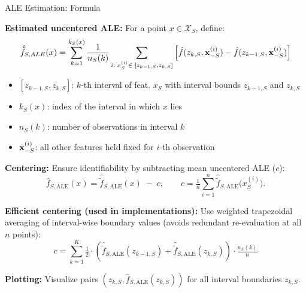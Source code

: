 \documentclass[10pt,compress,t,notes=noshow, xcolor=table]{beamer}
\begin{document}
\begin{frame}{ALE Estimation: Formula}

\textbf{Estimated uncentered ALE:}  
For a point $x \in \mathcal{X}_S$, define:
\[
\hat{\tilde{f}}_{S, ALE}(x) = \sum_{k = 1}^{k_S(x)}\frac{1}{n_S(k)}\sum_{i: \; x_S^{(i)} \in \; [z_{k-1, S}, z_{k, S}]}\left[\hat{f}(z_{k, S}, \mathbf{x}^{(i)}_{-S}) -\hat{f}(z_{k-1, S}, \mathbf{x}^{(i)}_{-S})\right]
\]

\begin{itemize}
  \item $[z_{k-1, S}, z_{k,S}]$: $k$-th interval of feat. $x_S$ with interval bounds $z_{k-1, S}$ and $z_{k,S}$ 
  \item $k_S(x)$: index of the interval in which $x$ lies
  \item $n_S(k)$: number of observations in interval $k$
  \item $\mathbf{x}_{-S}^{(i)}$: all other features held fixed for $i$-th observation
\end{itemize}

\pause
\medskip
\textbf{Centering:}  
Ensure identifiability by subtracting mean uncentered ALE ($c$):
\[
\hat f_{S,\text{ALE}}(x)=
\hat{\tilde f}_{S,\text{ALE}}(x)\;-\;c,
\qquad
c=\tfrac{1}{n}\textstyle\sum_{i=1}^{n}\hat{\tilde f}_{S,\text{ALE}}\bigl(x_S^{(i)}\bigr).
\]

\textbf{Efficient centering (used in implementations):}
Use weighted trapezoidal averaging of interval-wise boundary values (avoids redundant re-evaluation at all $n$ points):
\[
c =
\textstyle\sum_{k = 1}^{K} 
\tfrac{1
}{2} \cdot \left( 
\hat{\tilde{f}}_{S, \text{ALE}}(z_{k-1,S}) +
\hat{\tilde{f}}_{S, \text{ALE}}(z_{k,S}) \right) \cdot \tfrac{n_S(k)}{n} 
\]

\textbf{Plotting:} Visualize pairs $\left( z_{k,S}, \hat{f}_{S, \text{ALE}}(z_{k,S}) \right)$ for all interval boundaries $z_{k,S}$.
\end{frame}




\end{document}
